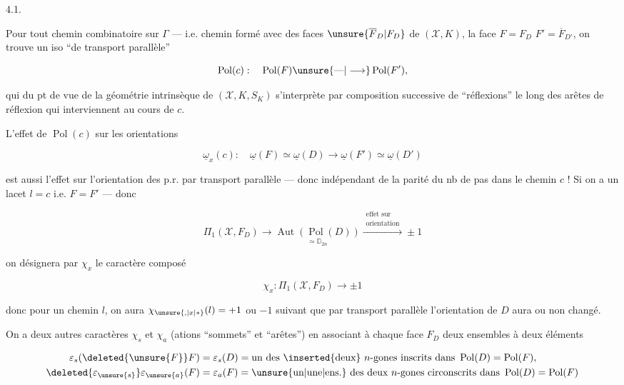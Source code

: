 

4.1.

Pour tout  chemin  combinatoire sur $\Gamma$ --- i.e. chemin formé avec des faces $\unsure{\overline F_D|F_D}$ de $(\mathcal X,K)$,  la face $F=F_D$  $F'=\overline F_{D'}$, on trouve un iso ``de transport parallèle''

\[ \operatorname{Pol}(c):\quad \operatorname{Pol}(F)\unsure{\text{---}|\longrightarrow}\operatorname{Pol}(F'), \]

qui du pt de vue de la géométrie intrinsèque de $(\mathcal X,K,S_K)$ s'interprète par composition successive de ``réflexions'' le long des arêtes de réflexion qui interviennent au cours de $c$.

L'effet de $\operatorname{Pol}(c)$ sur les orientations

\[ \underline{\omega}_x(c):\quad \underline{\omega}(F)\simeq\underline{\omega}(D)\longrightarrow\underline{\omega}(F')\simeq\underline{\omega}(D') \]

est aussi l'effet sur l'orientation des p.r. par transport parallèle --- donc  indépendant de la parité du nb de pas dans le chemin $c$ ! Si on a un lacet \deleted{\unsure{\ell}} $l=c$ i.e. $F=F'$ --- donc

\[ \Pi_1(\mathcal X,F_D)\longrightarrow\underset{\simeq\mathbb D_{2n}}{\operatorname{Aut}(\operatorname{Pol}(D))}\xrightarrow{\substack{\text{effet sur}\\\text{orientation}}}\pm1 \]

on désignera par $\chi_x$ le caractère composé

\[ \chi_x:\Pi_1(\mathcal X,F_D)\longrightarrow\pm1 \]

donc pour un chemin $l$, on aura $\chi_{\unsure{,|x|\ast}}(l)=+1$ ou $-1$ suivant que par transport parallèle l'orientation de $D$ aura ou non changé. 

On a deux autres caractères $\chi_s$ et $\chi_a$ (ations ``sommets'' et ``arêtes'') en associant à chaque face $F_D$  deux ensembles à deux éléments

\[ \begin{aligned}
\varepsilon_s(\deleted{\unsure{F}}F)&=\varepsilon_s(D)=\text{un des \inserted{deux} }n\text{-gones inscrits dans }\operatorname{Pol}(D)=\operatorname{Pol}(F),\\
\deleted{\varepsilon_{\unsure{s}}}\varepsilon_{\unsure{a}}(F)&=\varepsilon_a(F)=\text{\unsure{un|une|ens.} des deux }n\text{-gones circonscrits dans }\operatorname{Pol}(D)=\operatorname{Pol}(F)
\end{aligned} \]
